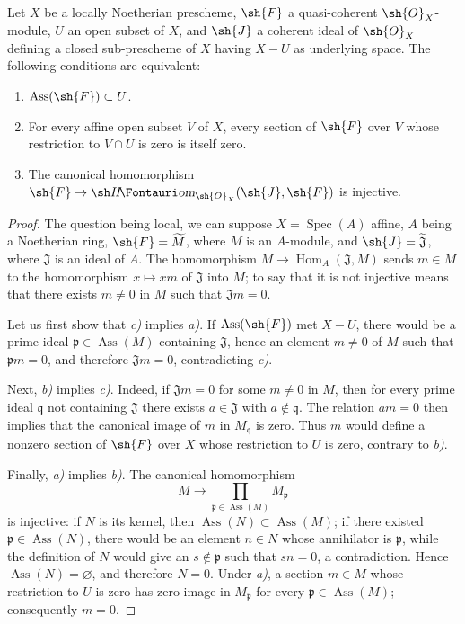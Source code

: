 
\begin{proposition}[3.1.8]
\label{IV.3.1.8}
Let $X$ be a locally Noetherian prescheme, $\sh{F}$ a quasi-coherent $\sh{O}_X$-module, $U$ an open subset of $X$, and $\sh{J}$ a coherent ideal of $\sh{O}_X$ defining a closed sub-prescheme of $X$ having $X-U$ as underlying space.
The following conditions are equivalent:
\begin{enumerate}
  \item[\emph{a)}] $\operatorname{Ass}(\sh{F})\subset U$.
  \item[\emph{b)}] For every affine open subset $V$ of $X$, every section of $\sh{F}$ over $V$ whose restriction to $V\cap U$ is zero is itself zero.
  \item[\emph{c)}] The canonical homomorphism $\sh{F}\to\shHom_{\sh{O}_X}(\sh{J},\sh{F})$ is injective.
\end{enumerate}
\end{proposition}

\begin{proof}
The question being local, we can suppose $X=\operatorname{Spec}(A)$ affine, $A$ being a Noetherian ring, $\sh{F}=\widetilde{M}$, where $M$ is an $A$-module, and $\sh{J}=\widetilde{\mathfrak{J}}$, where $\mathfrak{J}$ is an ideal of $A$.
The homomorphism $M\to\operatorname{Hom}_A(\mathfrak{J},M)$ sends $m\in M$ to the homomorphism $x\mapsto xm$ of $\mathfrak{J}$ into $M$; to say that it is not injective means that there exists $m\neq 0$ in $M$ such that $\mathfrak{J} m=0$.

Let us first show that \emph{c)} implies \emph{a)}. If $\operatorname{Ass}(\sh{F})$ met $X-U$, there would be a prime ideal $\mathfrak{p}\in\operatorname{Ass}(M)$ containing $\mathfrak{J}$, hence an element $m\neq 0$ of $M$ such that $\mathfrak{p}m=0$, and therefore $\mathfrak{J}m=0$, contradicting \emph{c)}.

Next, \emph{b)} implies \emph{c)}. Indeed, if $\mathfrak{J}m=0$ for some $m\neq 0$ in $M$, then for every prime ideal $\mathfrak{q}$ not containing $\mathfrak{J}$ there exists $a\in\mathfrak{J}$ with $a\notin\mathfrak{q}$. The relation $am=0$ then implies that the canonical image of $m$ in $M_\mathfrak{q}$ is zero. Thus $m$ would define a nonzero section of $\sh{F}$ over $X$ whose restriction to $U$ is zero, contrary to \emph{b)}.

Finally, \emph{a)} implies \emph{b)}. The canonical homomorphism
\[
M\longrightarrow\prod_{\mathfrak{p}\in\operatorname{Ass}(M)}M_\mathfrak{p}
\]
is injective: if $N$ is its kernel, then $\operatorname{Ass}(N)\subset\operatorname{Ass}(M)$; if there existed $\mathfrak{p}\in\operatorname{Ass}(N)$, there would be an element $n\in N$ whose annihilator is $\mathfrak{p}$, while the definition of $N$ would give an $s\notin\mathfrak{p}$ such that $sn=0$, a contradiction. Hence $\operatorname{Ass}(N)=\varnothing$, and therefore $N=0$. Under \emph{a)}, a section $m\in M$ whose restriction to $U$ is zero has zero image in $M_\mathfrak{p}$ for every $\mathfrak{p}\in\operatorname{Ass}(M)$; consequently $m=0$.
\end{proof}

